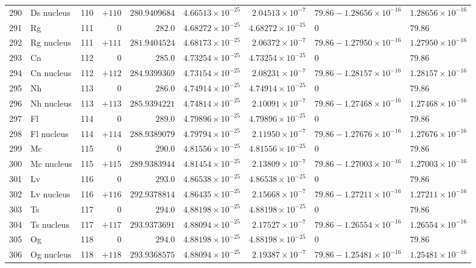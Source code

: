 {\begin{tabular}{@{}r l r r r r r l l@{}}
290 & Ds nucleus & 110 & $+110$ & $280.9409684$ & $4.66513{\times}10^{-25}$ & $2.04513{\times}10^{-7}$ & $79.86 - 1.28656{\times}10^{-16}$ & $1.28656{\times}10^{-16}$ \\
291 & Rg & 111 & $0$ & $282.0$ & $4.68272{\times}10^{-25}$ & $4.68272{\times}10^{-25}$ & $0$ & $79.86$ \\
292 & Rg nucleus & 111 & $+111$ & $281.9404524$ & $4.68173{\times}10^{-25}$ & $2.06372{\times}10^{-7}$ & $79.86 - 1.27950{\times}10^{-16}$ & $1.27950{\times}10^{-16}$ \\
293 & Cn & 112 & $0$ & $285.0$ & $4.73254{\times}10^{-25}$ & $4.73254{\times}10^{-25}$ & $0$ & $79.86$ \\
294 & Cn nucleus & 112 & $+112$ & $284.9399369$ & $4.73154{\times}10^{-25}$ & $2.08231{\times}10^{-7}$ & $79.86 - 1.28157{\times}10^{-16}$ & $1.28157{\times}10^{-16}$ \\
295 & Nh & 113 & $0$ & $286.0$ & $4.74914{\times}10^{-25}$ & $4.74914{\times}10^{-25}$ & $0$ & $79.86$ \\
296 & Nh nucleus & 113 & $+113$ & $285.9394221$ & $4.74814{\times}10^{-25}$ & $2.10091{\times}10^{-7}$ & $79.86 - 1.27468{\times}10^{-16}$ & $1.27468{\times}10^{-16}$ \\
297 & Fl & 114 & $0$ & $289.0$ & $4.79896{\times}10^{-25}$ & $4.79896{\times}10^{-25}$ & $0$ & $79.86$ \\
298 & Fl nucleus & 114 & $+114$ & $288.9389079$ & $4.79794{\times}10^{-25}$ & $2.11950{\times}10^{-7}$ & $79.86 - 1.27676{\times}10^{-16}$ & $1.27676{\times}10^{-16}$ \\
299 & Mc & 115 & $0$ & $290.0$ & $4.81556{\times}10^{-25}$ & $4.81556{\times}10^{-25}$ & $0$ & $79.86$ \\
300 & Mc nucleus & 115 & $+115$ & $289.9383944$ & $4.81454{\times}10^{-25}$ & $2.13809{\times}10^{-7}$ & $79.86 - 1.27003{\times}10^{-16}$ & $1.27003{\times}10^{-16}$ \\
301 & Lv & 116 & $0$ & $293.0$ & $4.86538{\times}10^{-25}$ & $4.86538{\times}10^{-25}$ & $0$ & $79.86$ \\
302 & Lv nucleus & 116 & $+116$ & $292.9378814$ & $4.86435{\times}10^{-25}$ & $2.15668{\times}10^{-7}$ & $79.86 - 1.27211{\times}10^{-16}$ & $1.27211{\times}10^{-16}$ \\
303 & Ts & 117 & $0$ & $294.0$ & $4.88198{\times}10^{-25}$ & $4.88198{\times}10^{-25}$ & $0$ & $79.86$ \\
304 & Ts nucleus & 117 & $+117$ & $293.9373691$ & $4.88094{\times}10^{-25}$ & $2.17527{\times}10^{-7}$ & $79.86 - 1.26554{\times}10^{-16}$ & $1.26554{\times}10^{-16}$ \\
305 & Og & 118 & $0$ & $294.0$ & $4.88198{\times}10^{-25}$ & $4.88198{\times}10^{-25}$ & $0$ & $79.86$ \\
306 & Og nucleus & 118 & $+118$ & $293.9368575$ & $4.88094{\times}10^{-25}$ & $2.19387{\times}10^{-7}$ & $79.86 - 1.25481{\times}10^{-16}$ & $1.25481{\times}10^{-16}$ \\
\bottomrule
\end{tabular}}
\endgroup
\clearpage

